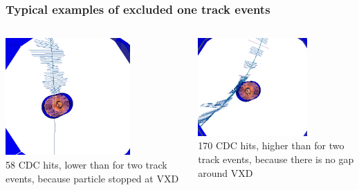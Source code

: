 \documentclass[18pt]{beamer}
\begin{document}
\begin{frame}
  \frametitle{Typical examples of excluded one track events}
  
  \begin{columns}
    \begin{column}{0.5\textwidth}
      \includegraphics[width=0.7\textwidth]{figures/b2display_screenshots/gcr_2017-08_run4182_evt7_onetrackevent_58cdchits_editet.png}\\
      58 CDC hits, lower than for two track events, because particle stopped at VXD
    \end{column}
    \begin{column}{0.5\textwidth}
      \includegraphics[width=0.7\textwidth]{figures/b2display_screenshots/gcr_2017-08_run4017_evt1_onetrackevent_170cdchits_edited.png}\\
      170 CDC hits, higher than for two track events, because there is no gap around VXD
    \end{column}
  \end{columns}
\end{frame}
\end{document}

